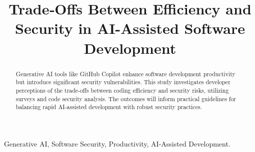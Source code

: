 \documentclass[conference]{IEEEtran} %
\begin{document}
\title{Trade‐Offs Between Efficiency and Security in AI-Assisted Software Development}

\author{
}

\maketitle

\begin{abstract}
Generative AI tools like GitHub Copilot enhance software development productivity but introduce significant security vulnerabilities. This study investigates developer perceptions of the trade-offs between coding efficiency and security risks, utilizing surveys and code security analysis. The outcomes will inform practical guidelines for balancing rapid AI-assisted development with robust security practices.
\end{abstract}

\begin{IEEEkeywords}
Generative AI, Software Security, Productivity, AI-Assisted Development.
\end{IEEEkeywords}

 










\begin{IEEEbiography}{}
\end{IEEEbiography}


\printbibliography
\end{document}
